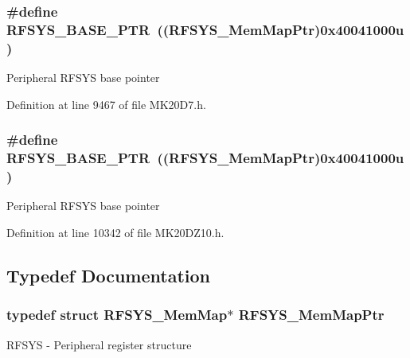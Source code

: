 \subsubsection[{\texorpdfstring{R\+F\+S\+Y\+S\+\_\+\+B\+A\+S\+E\+\_\+\+P\+TR}{RFSYS_BASE_PTR}}]{\setlength{\rightskip}{0pt plus 5cm}\#define R\+F\+S\+Y\+S\+\_\+\+B\+A\+S\+E\+\_\+\+P\+TR~(({\bf R\+F\+S\+Y\+S\+\_\+\+Mem\+Map\+Ptr})0x40041000u)}\hypertarget{group___r_f_s_y_s___peripheral_ga2dab66eae1abcaf22879dbce661ea2fa}{}\label{group___r_f_s_y_s___peripheral_ga2dab66eae1abcaf22879dbce661ea2fa}
Peripheral R\+F\+S\+YS base pointer 

Definition at line 9467 of file M\+K20\+D7.\+h.

\subsubsection[{\texorpdfstring{R\+F\+S\+Y\+S\+\_\+\+B\+A\+S\+E\+\_\+\+P\+TR}{RFSYS_BASE_PTR}}]{\setlength{\rightskip}{0pt plus 5cm}\#define R\+F\+S\+Y\+S\+\_\+\+B\+A\+S\+E\+\_\+\+P\+TR~(({\bf R\+F\+S\+Y\+S\+\_\+\+Mem\+Map\+Ptr})0x40041000u)}\hypertarget{group___r_f_s_y_s___peripheral_ga2dab66eae1abcaf22879dbce661ea2fa}{}\label{group___r_f_s_y_s___peripheral_ga2dab66eae1abcaf22879dbce661ea2fa}
Peripheral R\+F\+S\+YS base pointer 

Definition at line 10342 of file M\+K20\+D\+Z10.\+h.



\subsection{Typedef Documentation}
\subsubsection[{\texorpdfstring{R\+F\+S\+Y\+S\+\_\+\+Mem\+Map\+Ptr}{RFSYS_MemMapPtr}}]{\setlength{\rightskip}{0pt plus 5cm}typedef struct {\bf R\+F\+S\+Y\+S\+\_\+\+Mem\+Map}$\ast$ {\bf R\+F\+S\+Y\+S\+\_\+\+Mem\+Map\+Ptr}}\hypertarget{group___r_f_s_y_s___peripheral_gaea9e2f6aeeb4976615e3c3dd87acff9e}{}\label{group___r_f_s_y_s___peripheral_gaea9e2f6aeeb4976615e3c3dd87acff9e}
R\+F\+S\+YS -\/ Peripheral register structure 
